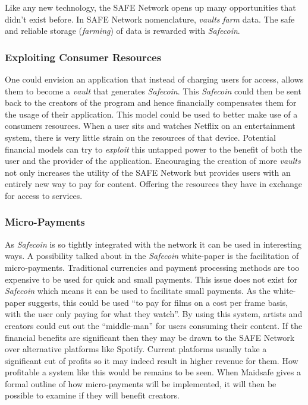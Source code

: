 Like any new technology, the SAFE Network opens up many opportunities that didn't exist before. In SAFE Network nomenclature, \textit{vaults} \textit{farm} data. The safe and reliable storage (\textit{farming}) of data is rewarded with \textit{Safecoin}. 

\subsubsection{Exploiting Consumer Resources}

One could envision an application that instead of charging users for access, allows them to become a \textit{vault} that generates \textit{Safecoin}. This \textit{Safecoin} could then be sent back to the creators of the program and hence financially compensates them for the usage of their application. This model could be used to better make use of a consumers resources. When a user sits and watches Netflix on an entertainment system, there is very little strain on the resources of that device. Potential financial models can try to \textit{exploit} this untapped power to the benefit of both the user and the provider of the application. Encouraging the creation of more \textit{vaults} not only increases the utility of the SAFE Network but provides users with an entirely new way to pay for content. Offering the resources they have in exchange for access to services.

\subsubsection{Micro-Payments}

As \textit{Safecoin} is so tightly integrated with the network it can be used in interesting ways. A possibility talked about in the \textit{Safecoin} white-paper\cite{lambert2015safecoin} is the facilitation of micro-payments. Traditional currencies and payment processing methods are too expensive to be used for quick and small payments. This issue does not exist for \textit{Safecoin} which means it can be used to facilitate small payments. As the white-paper suggests, this could be used ``to pay for films on a cost per frame basis, with the user only paying for what they watch''. By using this system, artists and creators could cut out the ``middle-man'' for users consuming their content. If the financial benefits are significant then they may be drawn to the SAFE Network over alternative platforms like Spotify. Current platforms usually take a significant cut of profits so it may indeed result in higher revenue for them. How profitable a system like this would be remains to be seen. When Maidsafe gives a formal outline of how micro-payments will be implemented, it will then be possible to examine if they will benefit creators.

